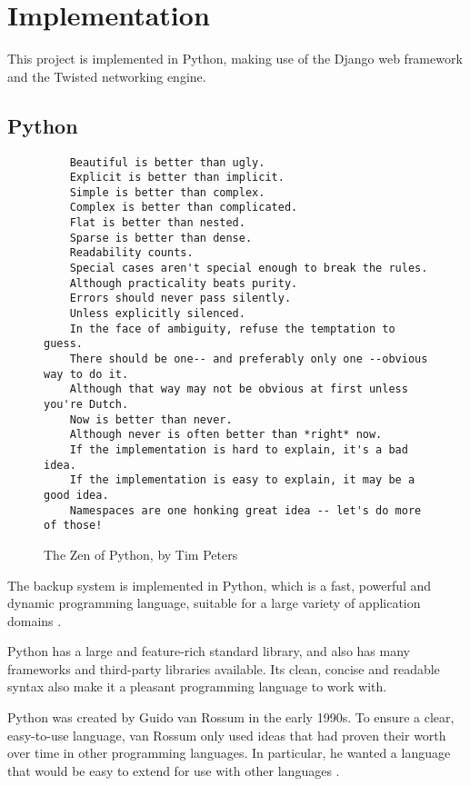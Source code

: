 \chapter{Implementation}
\label{sec:implementation}

This project is implemented in Python, making use of the Django web framework
and the Twisted networking engine.

\section{Python}
\label{sec:implementation-python}

\begin{figure}[h]
    \footnotesize
    \begin{verbatim}
    Beautiful is better than ugly.
    Explicit is better than implicit.
    Simple is better than complex.
    Complex is better than complicated.
    Flat is better than nested.
    Sparse is better than dense.
    Readability counts.
    Special cases aren't special enough to break the rules.
    Although practicality beats purity.
    Errors should never pass silently.
    Unless explicitly silenced.
    In the face of ambiguity, refuse the temptation to guess.
    There should be one-- and preferably only one --obvious way to do it.
    Although that way may not be obvious at first unless you're Dutch.
    Now is better than never.
    Although never is often better than *right* now.
    If the implementation is hard to explain, it's a bad idea.
    If the implementation is easy to explain, it may be a good idea.
    Namespaces are one honking great idea -- let's do more of those!
    \end{verbatim}
    \caption{The Zen of Python, by Tim Peters}
    \label{fig:zen-of-python}
\end{figure}

The backup system is implemented in Python, which is a fast, powerful and
dynamic programming language, suitable for a large variety of application
domains \cite{sanner1999}.

Python has a large and feature-rich standard library, and also has many
frameworks and third-party libraries available. Its clean, concise and readable
syntax also make it a pleasant programming language to work with.

Python was created by Guido van Rossum in the early 1990s. To ensure a clear,
easy-to-use language, van Rossum only used ideas that had proven their worth
over time in other programming languages. In particular, he wanted a language
that would be easy to extend for use with other languages \cite{lindstrom2005}.

